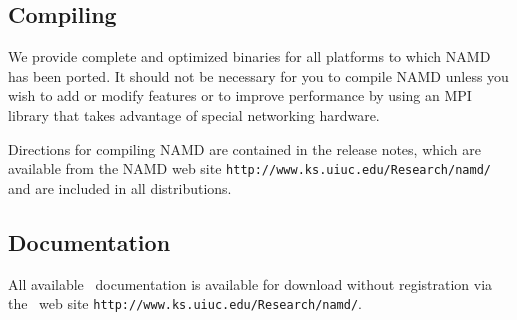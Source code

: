 \subsection{Compiling \NAMD}

We provide complete and optimized binaries for all
platforms to which NAMD has been ported.
It should not be necessary for you to compile
NAMD unless you wish to add or modify features
or to improve performance by using an MPI library
that takes advantage of special networking hardware.

Directions for compiling NAMD are contained in the release notes,
which are available from the NAMD web site
{\tt http://www.ks.uiuc.edu/Research/namd/}
and are included in all distributions.

\subsection{Documentation}

All available \NAMD\ documentation is available for download without
registration via the \NAMD\ web site
{\tt http://www.ks.uiuc.edu/Research/namd/}.

